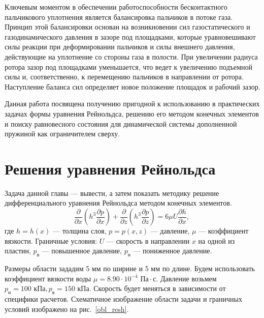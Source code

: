 \documentclass[a4paper,14pt]{extarticle}
\begin{document}
Ключевым моментом в обеспечении работоспособности бесконтактного пальчикового уплотнения является балансировка пальчиков в потоке газа.
Принцип этой балансировки основан на возникновении сил газостатического и газодинамического давления в зазоре под площадками, которые уравновешивают силы реакции при деформировании пальчиков и силы внешнего
давления, действующие на уплотнение со стороны газа в полости. При увеличении радиуса ротора зазор под площадками уменьшается, что ведет к
увеличению подъемной силы и, соответственно, к перемещению пальчиков в
направлении от ротора. Наступление баланса сил определяет новое положение площадок и рабочий зазор.

Данная работа посвящена получению пригодной к использованию в практических задачах формы уравнения Рейнольдса, решению его методом конечных элементов и поиску равновесного состояния для динамической системы дополненной пружиной как ограничителем сверху.

\section{Решения уравнения Рейнольдса}

Задача данной главы --- вывести, а затем показать методику решение дифференциального уравнения Рейнольдса методом конечных элементов.
\begin{equation}
	\label{reinolts-task}
	\frac{\partial}{\partial x} \left(h^3 \frac{\partial p}{\partial x} \right) + \frac{\partial}{\partial z} \left(h^3 \frac{\partial p}{\partial z} \right) = 6 \mu U \frac{\partial h}{\partial x} \text{, }
\end{equation}
где $h = h(x)$ --- толщина слоя, $p = p(x, z)$ --- давление, $\mu$ --- коэффициент вязкости. Граничные условия: $U$ --- скорость в направлении $x$ на одной из пластин, $p_{\text{в}}$ --- повышенное давление, $p_{\text{н}}$ --- пониженное давление. 

Размеры области зададим 5 мм по ширине и 5 мм по длине. Будем использовать коэффициент вязкости воды $\mu = 8.90 \cdot 10^{-4} \text{ Па} \cdot \text{с}$.
\newline Давление возьмем $p_{\text{н}} = 100 \text{ кПа}, p_{\text{в}} = 150 \text{ кПа}$. Скорость будет меняться в зависимости от специфики расчетов. Схематичное изображение области задачи и граничных условий изображено на рис.~\ref{obl_resh}.
\end{document}
